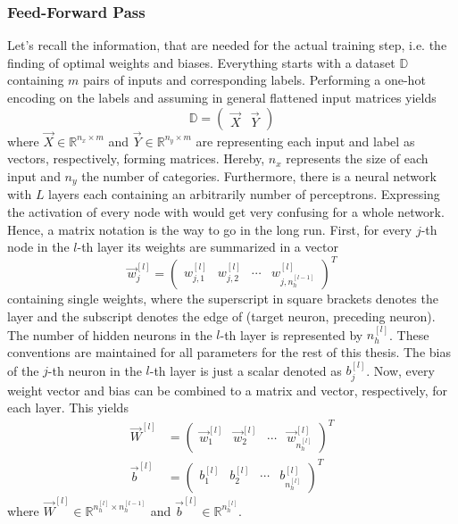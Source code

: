 \subsubsection{Feed-Forward Pass}
\label{sec:training-forward-pass}
Let's recall the information, that are needed for the actual training step, i.e. the finding of optimal weights and biases.
Everything starts with a dataset $\mathbb{D}$ containing $m$ pairs of inputs and corresponding labels.
Performing a one-hot encoding on the labels and assuming in general flattened input matrices yields
\begin{equation}
	\label{eq:dataset-one-hot}
	\mathbb{D} =
	\begin{pmatrix}
		\vec{X} & \vec{Y}
	\end{pmatrix}
\end{equation}
where $\vec{X} \in \mathbb{R}^{n_x \times m}$ and $\vec{Y} \in \mathbb{R}^{n_y \times m}$ are representing each input and label as vectors, respectively, forming matrices.
Hereby, $n_x$ represents the size of each input and $n_y$ the number of categories.
Furthermore, there is a neural network with $L$ layers each containing an arbitrarily number of perceptrons.
Expressing the activation of every node with  would get very confusing for a whole network.
Hence, a matrix notation is the way to go in the long run.
First, for every $j$-th node in the $l$-th layer its weights are summarized in a vector
\begin{equation}
	\label{eq:weights-vector}
	\vec{w}^{[l]}_j =
	\begin{pmatrix}
		w^{[l]}_{j,1} & w^{[l]}_{j,2} & \cdots & w^{[l]}_{j,n^{[l-1]}_h}
	\end{pmatrix}^T
\end{equation}
containing single weights, where the superscript in square brackets denotes the layer and the subscript denotes the edge of (target neuron, preceding neuron).
The number of hidden neurons in the $l$-th layer is represented by $n^{[l]}_h$.
These conventions are maintained for all parameters for the rest of this thesis.
The bias of the $j$-th neuron in the $l$-th layer is just a scalar denoted as $b^{[l]}_j$. 
Now, every weight vector and bias can be combined to a matrix and vector, respectively, for each layer.
This yields
\begin{subequations}
\label{eq:parameters}
	\begin{align}
		\vec{W}^{[l]} &=
		\begin{pmatrix}
			\vec{w}^{[l]}_1 & \vec{w}^{[l]}_2 & \cdots & \vec{w}^{[l]}_{n^{[l]}_h}
		\end{pmatrix}^T
		\label{eq:weights}
		\\
		\vec{b}^{[l]} &=
			\begin{pmatrix}
				b^{[l]}_1 & b^{[l]}_2 & \cdots & b^{[l]}_{n^{[l]}_h}
			\end{pmatrix}^T
		\label{eq:biases}
	\end{align}
\end{subequations}
where $\vec{W}^{[l]} \in \mathbb{R}^{n^{[l]}_h \times n^{[l-1]}_h}$ and $\vec{b}^{[l]} \in \mathbb{R}^{n^{[l]}_h}$.

